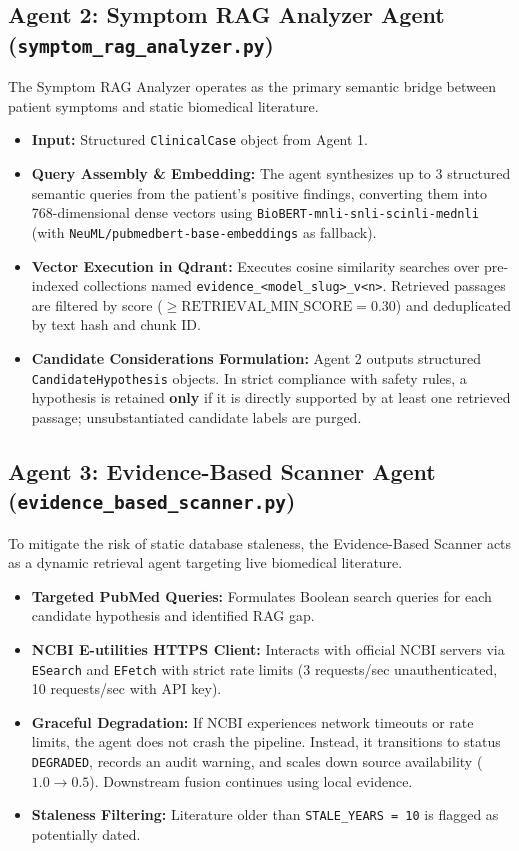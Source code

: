 \documentclass[12pt,a4paper]{report}
\begin{document}
\subsection{Agent 2: Symptom RAG Analyzer Agent (\texttt{symptom\_rag\_analyzer.py})}
The Symptom RAG Analyzer operates as the primary semantic bridge between patient symptoms and static biomedical literature.
\begin{itemize}
    \item \textbf{Input:} Structured \texttt{ClinicalCase} object from Agent 1.
    \item \textbf{Query Assembly \& Embedding:} The agent synthesizes up to 3 structured semantic queries from the patient's positive findings, converting them into 768-dimensional dense vectors using \texttt{BioBERT-mnli-snli-scinli-mednli} (with \texttt{NeuML/pubmedbert-base-embeddings} as fallback).
    \item \textbf{Vector Execution in Qdrant:} Executes cosine similarity searches over pre-indexed collections named \texttt{evidence\_<model\_slug>\_v<n>}. Retrieved passages are filtered by score ($\ge \text{RETRIEVAL\_MIN\_SCORE} = 0.30$) and deduplicated by text hash and chunk ID.
    \item \textbf{Candidate Considerations Formulation:} Agent 2 outputs structured \texttt{CandidateHypothesis} objects. In strict compliance with safety rules, a hypothesis is retained \textbf{only} if it is directly supported by at least one retrieved passage; unsubstantiated candidate labels are purged.
\end{itemize}

\subsection{Agent 3: Evidence-Based Scanner Agent (\texttt{evidence\_based\_scanner.py})}
To mitigate the risk of static database staleness, the Evidence-Based Scanner acts as a dynamic retrieval agent targeting live biomedical literature.
\begin{itemize}
    \item \textbf{Targeted PubMed Queries:} Formulates Boolean search queries for each candidate hypothesis and identified RAG gap.
    \item \textbf{NCBI E-utilities HTTPS Client:} Interacts with official NCBI servers via \texttt{ESearch} and \texttt{EFetch} with strict rate limits (3 requests/sec unauthenticated, 10 requests/sec with API key).
    \item \textbf{Graceful Degradation:} If NCBI experiences network timeouts or rate limits, the agent does not crash the pipeline. Instead, it transitions to status \texttt{DEGRADED}, records an audit warning, and scales down source availability ($1.0 \to 0.5$). Downstream fusion continues using local evidence.
    \item \textbf{Staleness Filtering:} Literature older than \texttt{STALE\_YEARS = 10} is flagged as potentially dated.
\end{itemize}
\end{document}
